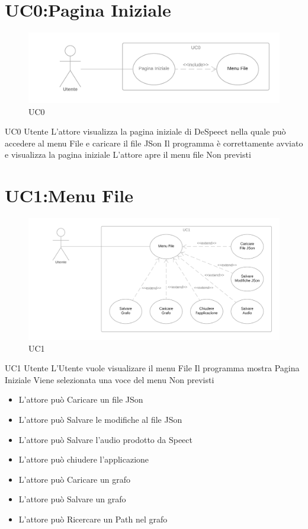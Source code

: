 \documentclass[../AnalisideiRequisiti.tex]{subfiles}
\begin{document}
	\section{UC0:Pagina Iniziale}
	\begin{figure}[H]
		\caption{UC0}
		\centering
		\includegraphics[width=\textwidth]{../img/UC00.png}
	\end{figure}
	\UserCase
	{UC0}
	{Utente}
	{}
	{L'attore visualizza la pagina iniziale di DeSpeect nella quale può accedere al menu File e caricare il file JSon}
	{Il programma è correttamente avviato e visualizza la pagina iniziale}
	{L'attore apre il menu file}
	{Non previsti}
	{}
	\section{UC1:Menu File}
	\begin{figure}[H]
	\caption{UC1}
	\centering
	\includegraphics[width=\textwidth]{../img/UC01.png}
	\end{figure}
	\UserCase
	{UC1}
	{Utente}
	{}
	{L'Utente vuole visualizare il menu File}
	{Il programma mostra Pagina Iniziale }
	{Viene selezionata una voce del menu}
	{Non previsti}
	{	\begin{itemize}
		\item{} L'attore può Caricare un file JSon 
		\item{} L'attore può Salvare le modifiche al file JSon 
		\item{} L'attore può Salvare l'audio prodotto da Speect 
		\item{} L'attore può chiudere l'applicazione 
		\item{} L'attore può Caricare un grafo 
		\item{} L'attore può Salvare un grafo 
		\item{} L'attore può Ricercare un Path nel grafo 
		\end{itemize}
	}
\end{document}
